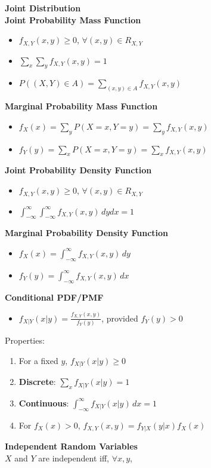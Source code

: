 \documentclass[a4paper, 12pt]{article}
\begin{document}
\begin{multicols*}{4}
\medskip

{\small\textbf{Joint Distribution}} \\
\textbf{Joint Probability Mass Function}
\begin{itemize}
    \item $f_{X, Y}(x, y) \geq 0$, $\forall (x, y) \in R_{X, Y}$
    \item $\sum_x \sum_y f_{X,Y}(x, y)=1$
    \item $P((X, Y) \in A) = \sum_{(x, y) \in A} f_{X, Y}(x, y)$
\end{itemize}
\medskip
\textbf{Marginal Probability Mass Function}
\begin{itemize}
    \item $f_X(x) = \sum_y P(X = x, Y = y) = \sum_y f_{X,Y}(x,y)$
    \item $f_Y(y) = \sum_x P(X = x, Y = y) = \sum_x f_{X,Y}(x,y)$
\end{itemize}
\textbf{Joint Probability Density Function}
\begin{itemize}
    \item $f_{X, Y}(x,y) \geq 0$, $\forall (x, y) \in R_{X, Y}$
    \item $\int_{-\infty}^{\infty}\int_{-\infty}^{\infty}f_{X,Y}(x,y) \, dydx = 1$
\end{itemize}
\textbf{Marginal Probability Density Function}
\begin{itemize}
    \item $f_X(x) = \int_{-\infty}^{\infty} f_{X,Y}(x,y) \, dy$ 
    \item $f_Y(y) = \int_{-\infty}^{\infty} f_{X,Y}(x,y) \, dx$ 
\end{itemize}
\textbf{Conditional PDF/PMF}
\begin{itemize}
    \item $f_{X|Y}(x|y) = \frac{f_{X,Y}(x,y)}{f_Y(y)}$, provided $f_Y(y) > 0$
\end{itemize}
Properties:
\begin{enumerate}
    \item For a fixed $y$, $f_{X|Y}(x|y) \geq 0$
    \item \textbf{Discrete}: $\sum_x f_{X|Y}(x|y) = 1$
    \item \textbf{Continuous}: $\int_{-\infty}^{\infty} f_{X|Y}(x|y) \, dx = 1$
    \item For $f_X(x) > 0$, $f_{X,Y}(x,y) = f_{Y|X}(y|x)f_X(x)$
\end{enumerate}
\textbf{Independent Random Variables} \\
$X$ and $Y$ are independent iff, $\forall x,y$,

\end{multicols*}
\end{document}
